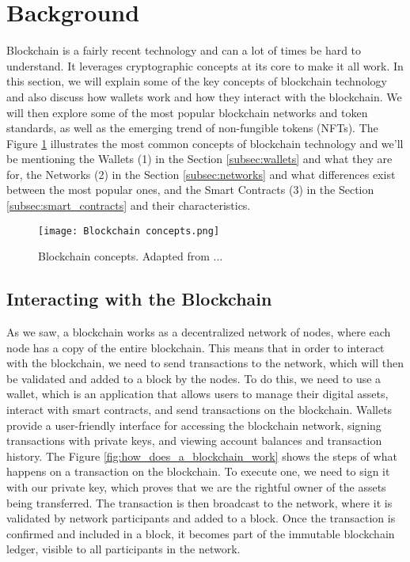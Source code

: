 \section{Background}
\label{sec:background}

Blockchain is a fairly recent technology and can a lot of times be hard to understand. It leverages cryptographic concepts at its core to make it all work. In this section, we will explain some of the key concepts of blockchain technology and also discuss how wallets work and how they interact with the blockchain. We will then explore some of the most popular blockchain networks and token standards, as well as the emerging trend of non-fungible tokens (NFTs). The Figure \ref{fig:blockchain_concepts} illustrates the most common concepts of blockchain technology and we'll be mentioning the Wallets (1) in the Section \ref{subsec:wallets} and what they are for, the Networks (2) in the Section \ref{subsec:networks} and what differences exist between the most popular ones, and the Smart Contracts (3) in the Section \ref{subsec:smart_contracts} and their characteristics.

\begin{figure}[H]
    \texttt{[image: Blockchain concepts.png]}
    \centering
    \caption[Blockchain concepts]{Blockchain concepts. Adapted from ...}
    \label{fig:blockchain_concepts}
\end{figure}

\subsection{Interacting with the Blockchain}
\label{subsec:interacting_with_the_blockchain}

As we saw, a blockchain works as a decentralized network of nodes, where each node has a copy of the entire blockchain. This means that in order to interact with the blockchain, we need to send transactions to the network, which will then be validated and added to a block by the nodes. To do this, we need to use a wallet, which is an application that allows users to manage their digital assets, interact with smart contracts, and send transactions on the blockchain. Wallets provide a user-friendly interface for accessing the blockchain network, signing transactions with private keys, and viewing account balances and transaction history.
The Figure \ref{fig:how_does_a_blockchain_work} shows the steps of what happens on a transaction on the blockchain. To execute one, we need to sign it with our private key, which proves that we are the rightful owner of the assets being transferred. The transaction is then broadcast to the network, where it is validated by network participants and added to a block. Once the transaction is confirmed and included in a block, it becomes part of the immutable blockchain ledger, visible to all participants in the network.

